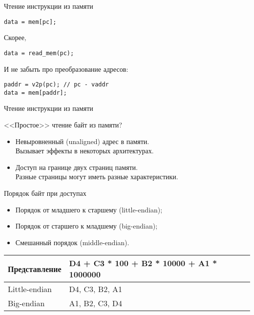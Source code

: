 \begin{frame}[fragile]{Чтение инструкции из памяти}

\texttt{data = mem[pc];}\pause

Скорее,

\texttt{data = read_mem(pc);}\pause

И не забыть про преобразование адресов:

\begin{verbatim}
paddr = v2p(pc); // pc - vaddr
data = mem[paddr];
\end{verbatim}

\end{frame}

\begin{frame}{Чтение инструкции из памяти}

<<Простое>> чтение байт из памяти?

\pause

\begin{itemize}
    \item Невыровненный (unaligned) адрес в памяти. \\
    Вызывает эффекты в некоторых архитектурах.
    \pause\bigskip
    \item Доступ на границе двух страниц памяти. \\
    Разные страницы могут иметь разные характеристики.
\end{itemize}

\end{frame}

\begin{frame}{Порядок байт при доступах}

\begin{itemize}
    \item Порядок от младшего к старшему (little-endian);
    \item Порядок от старшего к младшему (big-endian);
    \item Смешанный порядок (middle-endian).
\end{itemize}

\pause

\begin{table}[htpb]
    \centering
    \begin{tabular}{|l|l|}
    \hline
    Представление   &   D4 + C3 * 100 + B2 * 10000 + A1 * 1000000   \\
    \hline
    Little-endian   &   D4, C3, B2, A1                              \\
    \hline
    Big-endian      &   A1, B2, C3, D4                              \\
    \hline
    \end{tabular}
\end{table}

\end{frame}

